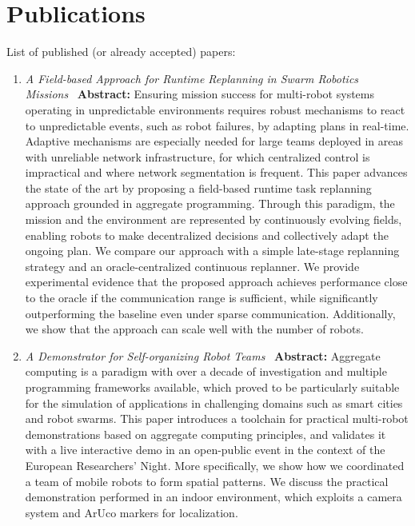 \documentclass[runningheads]{llncs}
\begin{document}
    \section{Publications}\label{sec:publications}
    List of published (or already accepted) papers:
    \begin{enumerate}
        \item \emph{A Field-based Approach for Runtime Replanning in Swarm Robotics Missions}~\cite{DBLP:conf/acsos/AguzziBCMPPV25}
        \textbf{Abstract:}
        Ensuring mission success for multi-robot systems operating
        in unpredictable environments requires robust mechanisms to react to unpredictable events,
            such as robot failures,
            by adapting plans in real-time.
            Adaptive mechanisms are especially needed for large teams deployed in areas with unreliable network infrastructure,
            for which centralized control is impractical and where network segmentation is frequent.
            This paper advances the state of the art by proposing a field-based runtime task replanning approach grounded in aggregate programming.
            Through this paradigm,
            the mission and the environment are represented by continuously evolving fields,
            enabling robots to make decentralized decisions
            and collectively adapt the ongoing plan.
            We compare our approach with a simple late-stage replanning strategy
            and an oracle-centralized continuous replanner.
            We provide experimental evidence that
            the proposed approach achieves performance close to the oracle if the communication range is sufficient,
            while significantly outperforming the baseline even under sparse communication.
            Additionally, we show that the approach can scale well with the number of robots.

        \item \emph{A Demonstrator for Self-organizing Robot Teams}~\cite{DBLP:conf/coordination/AguzziBBCCDFPV25}
        \textbf{Abstract:}
            Aggregate computing is a paradigm with over a decade of investigation and multiple programming frameworks available,
            which proved to be particularly suitable for the simulation of applications in challenging domains such as smart cities and robot swarms.
            This paper introduces a toolchain for practical multi-robot demonstrations based on aggregate computing principles,
            and validates it with a live interactive demo in an open-public event in the context of the European Researchers’ Night.
            More specifically,
            we show how we coordinated a team of mobile robots to form spatial patterns.
            We discuss the practical demonstration performed in an indoor environment,
            which exploits a camera system and ArUco markers for localization.
    \end{enumerate}
\end{document}
